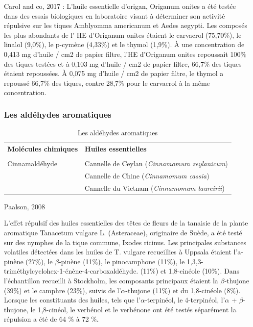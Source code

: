 \documentclass[12pt,a4wide]{article}
\begin{document}
Carol and co, 2017 : L'huile  essentielle d'origan, Origanum onites a été testée
dans  des essais  biologiques en  laboratoire visant  à déterminer  son activité
répulsive sur les tiques Amblyomma americanum et Aedes aegypti. Les composés les
plus abondants  de l'  HE d'Origanum  onites étaient  le carvacrol  (75,70\%), le
linalol (9,0\%), le p-cymène (4,33\%) et  le thymol (1,9\%). À une concentration de
0,413 mg d'huile / cm2 de  papier filtre, l'HE d'Origanum onites repoussait 100\%
des tiques  testées et  à 0,103  mg d'huile /  cm2 de  papier filtre,  66,7\% des
tiques étaient repoussées. À 0,075 mg d'huile  / cm2 de papier filtre, le thymol
a  repoussé  66,7\%  des  tiques,  contre  28,7\% pour  le  carvacrol  à  la  même
concentration.


\subsubsection{Les aldéhydes aromatiques}
\label{sec-4-3-3}

\begin{table}[htb]
\caption{Les aldéhydes aromatiques}
\centering
\begin{tabular}{ll}
\textbf{Molécules chimiques} & \textbf{Huiles essentielles}\\
 & \\
\hline
Cinnamaldéhyde & Cannelle de Ceylan (\emph{Cinnamomum zeylanicum})\\
 & Cannelle de Chine (\emph{Cinnamomum cassia})\\
 & Cannelle du Vietnam (\emph{Cinnamomum laureirii})\\
\hline
\end{tabular}
\end{table}




Paalson, 2008

L'effet répulsif des huiles essentielles des têtes de fleurs de la tanaisie de
la plante aromatique Tanacetum vulgare L. (Asteraceae), originaire de Suède, a
été testé sur des nymphes de la tique commune, Ixodes ricinus. Les principales
substances volatiles détectées dans les huiles de T. vulgare recueillies à
Uppsala étaient l’a-pinène (27\%), le $\beta$-pinène (11\%), le pinocamphone (11\%), le
1,3,3-triméthylcyclohex-1-énène-4-carboxaldéhyde. (11\%) et 1,8-cinéole
(10\%). Dans l'échantillon recueilli à Stockholm, les composants principaux
étaient la $\beta$-thujone (39\%) et le camphre (23\%), suivis de l'$\alpha$-thujone (11\%) et
du 1,8-cinéole (8\%). Lorsque les constituants des huiles, tels que
l'$\alpha$-terpinéol, le 4-terpinéol, l'$\alpha$ + $\beta$-thujone, le 1,8-cinéol, le verbénol et le
verbénone ont été testés séparément la répulsion a été de 64 \% à 72 \%.
\end{document}
